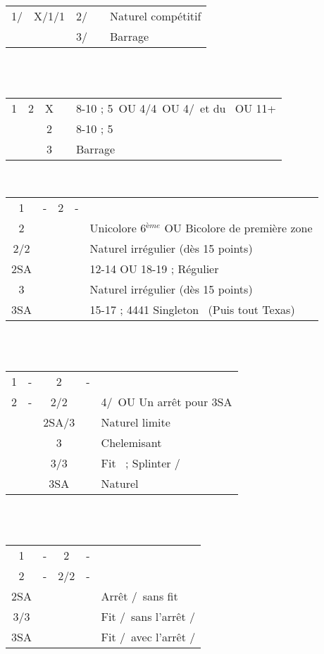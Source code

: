 \documentclass[a4paper, oneside, 11pt]{report}
\begin{document}
		\begin{tabular}{cccc|l}
		1\trefle/\carreau & X/1\carreau/1\coeur & 2\trefle/\carreau && Naturel compétitif\\
		&& 3\trefle/\carreau && Barrage\\
		\end{tabular}\\\\

		\begin{tabular}{cccc|l}
		1\carreau & 2\trefle & X && 8-10 ; 5\pique\ OU 4\coeur/4\pique\ OU 4\coeur/\pique\ et du \carreau\ OU 11+\\
		&& 2\carreau && 8-10 ; 5\coeur\\
		&& 3\carreau && Barrage\\
		\end{tabular}\\

\newpage
		\begin{tabular}{cccc|l}
		1\carreau & - & 2\trefle & - &\\
		2\carreau &&&& Unicolore 6$^{ème}$ OU Bicolore de première zone\\
		2\coeur/2\pique &&&& Naturel irrégulier (dès 15 points) \\
		2SA &&&& 12-14 OU 18-19 ; Régulier\\
		3\trefle &&&& Naturel irrégulier (dès 15 points)\\
		3SA &&&& 15-17 ; 4441 Singleton \trefle\ (Puis tout Texas)\\
		\end{tabular}\\\\

		\begin{tabular}{cccc|l}
		1\carreau & - & 2\trefle & - &\\
		2\carreau & - & 2\coeur/2\pique && 4\coeur/\pique\ OU Un arrêt pour 3SA\\
		&& 2SA/3\trefle && Naturel limite\\
		&& 3\carreau && Chelemisant \carreau\\
		&& 3\coeur/3\pique && Fit \carreau\ ; Splinter \coeur/\pique\\
		&& 3SA && Naturel\\
		\end{tabular}\\\\

		\begin{tabular}{cccc|l}
		1\carreau & - & 2\trefle & - &\\
		2\carreau & - & 2\coeur/2\pique & - &\\
		2SA &&&& Arrêt \pique/\coeur\ sans fit\\
		3\coeur/3\pique &&&& Fit \coeur/\pique\ sans l'arrêt \pique/\coeur\\
		3SA &&&& Fit \coeur/\pique\ avec l'arrêt \pique/\coeur\\
		\end{tabular}\\\\
\end{document}
